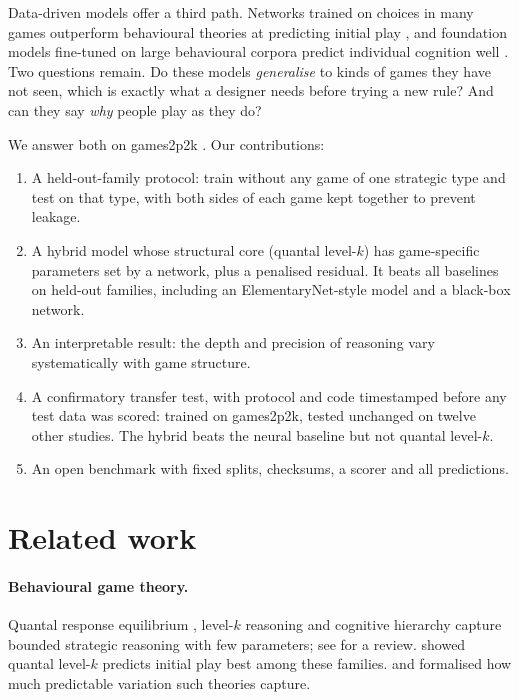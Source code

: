 \documentclass[11pt]{article}
\begin{document}
Data-driven models offer a third path. Networks trained on choices in many games outperform
behavioural theories at predicting initial play \citep{hartford2016deep,zhu2025capturing}, and
foundation models fine-tuned on large behavioural corpora predict individual cognition well
\citep{binz2025centaur}. Two questions remain. Do these models \emph{generalise} to kinds of games
they have not seen, which is exactly what a designer needs before trying a new rule? And can they
say \emph{why} people play as they do?

We answer both on games2p2k \citep{zhu2025capturing}. Our contributions:
\begin{enumerate}
  \item A held-out-family protocol: train without any game of one strategic type and test on that type, with both sides of each game kept together to prevent leakage.
  \item A hybrid model whose structural core (quantal level-$k$) has game-specific parameters set by a network, plus a penalised residual. It beats all baselines on held-out families, including an ElementaryNet-style model \citep{deon2026elementarynet} and a black-box network.
  \item An interpretable result: the depth and precision of reasoning vary systematically with game structure.
  \item A confirmatory transfer test, with protocol and code timestamped before any test data was scored: trained on games2p2k, tested unchanged on twelve other studies. The hybrid beats the neural baseline but not quantal level-$k$.
  \item An open benchmark with fixed splits, checksums, a scorer and all predictions.
\end{enumerate}

\section{Related work}

\paragraph{Behavioural game theory.} Quantal response equilibrium \citep{mckelvey1995quantal},
level-$k$ reasoning \citep{stahl1995players,nagel1995unraveling} and cognitive hierarchy
\citep{camerer2004cognitive} capture bounded strategic reasoning with few parameters; see
\citet{crawford2013structural} for a review. \citet{wright2017predicting} showed quantal level-$k$
predicts initial play best among these families. \citet{fudenberg2019initial} and
\citet{fudenberg2022completeness} formalised how much predictable variation such theories capture.
\end{document}
